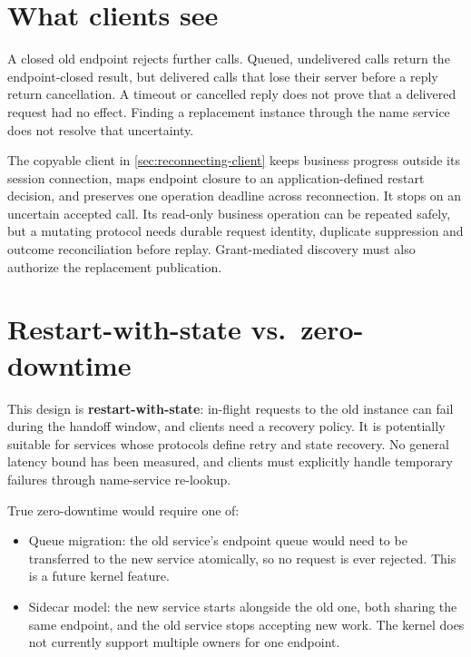 \section{What clients see}

A closed old endpoint rejects further calls. Queued, undelivered calls return
the endpoint-closed result, but delivered calls that lose their server before a
reply return cancellation. A timeout or cancelled reply does not prove that a
delivered request had no effect. Finding a replacement instance through the name
service does not resolve that uncertainty.

The copyable client in \autoref{sec:reconnecting-client} keeps business progress
outside its session connection, maps endpoint closure to an application-defined
restart decision, and preserves one operation deadline across reconnection.
It stops on an uncertain accepted call. Its read-only business operation can be
repeated safely, but a mutating protocol needs durable request identity, duplicate
suppression and outcome reconciliation before replay. Grant-mediated discovery
must also authorize the replacement publication.

\section{Restart-with-state vs.\ zero-downtime}

This design is \textbf{restart-with-state}: in-flight requests to the old
instance can fail during the handoff window, and clients need a recovery policy. It is
potentially suitable for services whose protocols define retry and state
recovery. No general latency bound has been measured, and clients must
explicitly handle temporary failures through name-service re-lookup.

True zero-downtime would require one of:

\begin{itemize}
    \item Queue migration: the old service's endpoint queue would
        need to be transferred to the new service atomically, so no request
        is ever rejected. This is a future kernel feature.
    \item Sidecar model: the new service starts alongside the old
        one, both sharing the same endpoint, and the old service stops
        accepting new work. The kernel does not currently support multiple
        owners for one endpoint.
\end{itemize}

